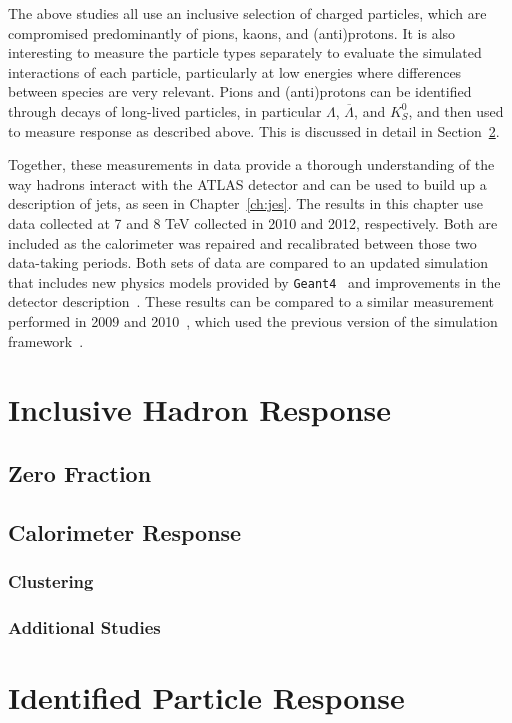 The above studies all use an inclusive selection of charged particles, which are compromised predominantly of pions, kaons, and (anti)protons. It is also interesting to measure the particle types separately to evaluate the simulated interactions of each particle, particularly at low energies where differences between species are very relevant. Pions and (anti)protons can be identified through decays of long-lived particles, in particular $\Lambda$, $\overline{\Lambda}$, and $K_{S}^{0}$, and then used to measure response as described above. This is discussed in detail in Section~\ref{sec:identified}.

Together, these measurements in data provide a thorough understanding of the way hadrons interact with the ATLAS detector and can be used to build up a description of jets, as seen in Chapter~\ref{ch:jes}. The results in this chapter use data collected at 7 and 8 TeV collected in 2010 and 2012, respectively. Both are included as the calorimeter was repaired and recalibrated between those two data-taking periods. Both sets of data are compared to an updated simulation that includes new physics models provided by \texttt{Geant4}~\cite{GEANT4} and improvements in the detector description~\cite{PERF-2011-08,PERF-2013-05}. These results can be compared to a similar measurement performed in 2009 and 2010~\cite{PERF-2011-05}, which used the previous version of the simulation framework~\cite{SOFT-2010-01}.



\section{Inclusive Hadron Response}
\label{sec:inclusive}

\subsection{Zero Fraction}
\label{sec:zero_fraction}

\subsection{Calorimeter Response}
\label{sec:response}

\subsubsection{Clustering}
\label{sec:clustering}

\subsubsection{Additional Studies}
\label{sec:additional}


\section{Identified Particle Response}
\label{sec:identified}

